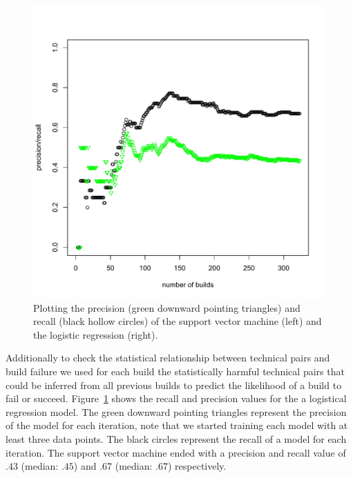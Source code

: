\documentclass[conference]{IEEEtran}
\begin{document}
\begin{figure}[t]
\centering
\includegraphics[width=\columnwidth]{precision-recall-logreg}
\caption{Plotting the precision (green downward pointing triangles) and recall (black hollow circles) of the support vector machine (left) and the logistic regression (right).}
\label{fig:prediction}
\end{figure}

Additionally to check the statistical relationship between technical pairs and build failure we used for each build the statistically harmful technical pairs that could be inferred from all previous builds to predict the likelihood of a build to fail or succeed.
Figure~\ref{fig:prediction} shows the recall and precision values for the
a logistical regression model. The green downward
pointing triangles represent the precision of the model for each iteration, note that we started training each model with at least three data points. The black circles represent the recall of a model for each
iteration.
The support vector machine ended with a precision and recall value of $.43$ (median: $.45$) and $.67$ (median: $.67$) respectively.
\end{document}

